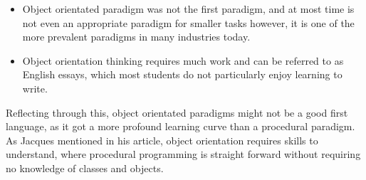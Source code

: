 

\begin{itemize}
 \item Object orientated paradigm was not the first paradigm, and at most time is not even an appropriate paradigm for smaller tasks however, it is one of the more prevalent paradigms in many industries today.
 \item Object orientation thinking requires much work and can be referred to as English essays, which most students do not particularly enjoy learning to write.\cite{tutlisp}\cite{medlisp}
\end{itemize}
Reflecting through this, object orientated paradigms might not be a good first language, as it got a more profound learning curve than a procedural paradigm. As Jacques mentioned in his article, object orientation requires skills to understand, where procedural programming is straight forward without requiring no knowledge of classes and objects.\\
\\
